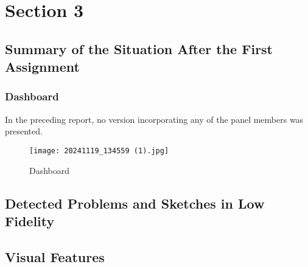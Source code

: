 \chapter{Section 3}
\section{Summary of the Situation After the First Assignment}
\subsection{Dashboard}
In the preceding report, no version incorporating any 
of the panel members was presented. 
\begin{figure}[H]
    \centerline{%
    \texttt{[image: 20241119\_134559 (1).jpg]}
    }
    \caption{Dashboard}
\end{figure}
\section{Detected Problems and Sketches in Low Fidelity}
\section{Visual Features}
